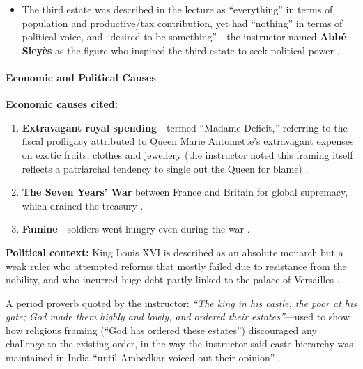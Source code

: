 \begin{CriticalPoint}
\begin{itemize}
    \item The third estate was described in the lecture as ``everything'' in terms of population and productive/tax contribution, yet had ``nothing'' in terms of political voice, and ``desired to be something''---the instructor named \textbf{Abbé Sieyès} as the figure who inspired the third estate to seek political power .
\end{itemize}
\end{CriticalPoint}

\paragraph{Economic and Political Causes}

\begin{DataFact}
\textbf{Economic causes cited:}
\begin{enumerate}[label=(\roman*)]
    \item \textbf{Extravagant royal spending}---termed ``Madame Deficit,'' referring to the fiscal profligacy attributed to Queen Marie Antoinette's extravagant expenses on exotic fruits, clothes and jewellery (the instructor noted this framing itself reflects a patriarchal tendency to single out the Queen for blame) .
    \item \textbf{The Seven Years' War} between France and Britain for global supremacy, which drained the treasury .
    \item \textbf{Famine}---soldiers went hungry even during the war .
\end{enumerate}
\textbf{Political context:} King Louis XVI is described as an absolute monarch but a weak ruler who attempted reforms that mostly failed due to resistance from the nobility, and who incurred huge debt partly linked to the palace of Versailles .
\end{DataFact}

\begin{ExampleBox}
A period proverb quoted by the instructor: \textit{``The king in his castle, the poor at his gate; God made them highly and lowly, and ordered their estates''}---used to show how religious framing (``God has ordered these estates'') discouraged any challenge to the existing order, in the way the instructor said caste hierarchy was maintained in India ``until Ambedkar voiced out their opinion'' .
\end{ExampleBox}

